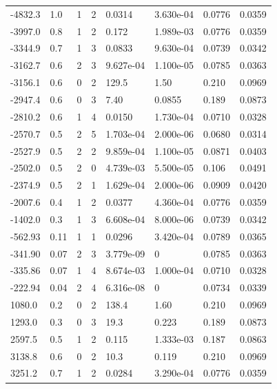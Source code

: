 \documentclass[preview]{standalone}
\begin{document}
{{\begin{tabular}{L{1.2cm}C{1.2cm} C{0.3cm}C{0.5cm} C{1.4cm}C{1.4cm} C{1.4cm}C{1.4cm}}
  -4832.3  &   1.0  & 1     &  2 &  0.0314  & 3.630e-04  & 0.0776 &  0.0359   \\ 
  -3997.0  &   0.8  & 1     &  2 &  0.172  & 1.989e-03  & 0.0776 &  0.0359   \\ 
  -3344.9  &   0.7  & 1     &  3 &  0.0833  & 9.630e-04  & 0.0739 &  0.0342   \\ 
  -3162.7  &   0.6  & 2     &  3 &  9.627e-04  & 1.100e-05  & 0.0785 &  0.0363   \\ 
  -3156.1  &   0.6  & 0     &  2 &  129.5  & 1.50  & 0.210 &  0.0969   \\ 
  -2947.4  &   0.6  & 0     &  3 &  7.40  & 0.0855  & 0.189 &  0.0873   \\ 
  -2810.2  &   0.6  & 1     &  4 &  0.0150  & 1.730e-04  & 0.0710 &  0.0328   \\ 
  -2570.7  &   0.5  & 2     &  5 &  1.703e-04  & 2.000e-06  & 0.0680 &  0.0314   \\ 
  -2527.9  &   0.5  & 2     &  2 &  9.859e-04  & 1.100e-05  & 0.0871 &  0.0403   \\ 
  -2502.0  &   0.5  & 2     &  0 &  4.739e-03  & 5.500e-05  & 0.106 &  0.0491   \\ 
  -2374.9  &   0.5  & 2     &  1 &  1.629e-04  & 2.000e-06  & 0.0909 &  0.0420   \\ 
  -2007.6  &   0.4  & 1     &  2 &  0.0377  & 4.360e-04  & 0.0776 &  0.0359   \\ 
  -1402.0  &   0.3  & 1     &  3 &  6.608e-04  & 8.000e-06  & 0.0739 &  0.0342   \\ 
  -562.93  &  0.11  & 1     &  1 &  0.0296  & 3.420e-04  & 0.0789 &  0.0365   \\ 
  -341.90  &  0.07  & 2     &  3 &  3.779e-09  & 0  & 0.0785 &  0.0363   \\ 
  -335.86  &  0.07  & 1     &  4 &  8.674e-03  & 1.000e-04  & 0.0710 &  0.0328   \\ 
  -222.94  &  0.04  & 2     &  4 &  6.316e-08  & 0  & 0.0734 &  0.0339   \\ 
  1080.0  &   0.2  & 0     &  2 &  138.4  & 1.60  & 0.210 &  0.0969   \\ 
  1293.0  &   0.3  & 0     &  3 &  19.3  & 0.223  & 0.189 &  0.0873   \\ 
  2597.5  &   0.5  & 1     &  2 &  0.115  & 1.333e-03  & 0.187 &  0.0863   \\ 
  3138.8  &   0.6  & 0     &  2 &  10.3  & 0.119  & 0.210 &  0.0969   \\ 
  3251.2  &   0.7  & 1     &  2 &  0.0284  & 3.290e-04  & 0.0776 &  0.0359   \\ 

\end{tabular}}}
\end{document}
